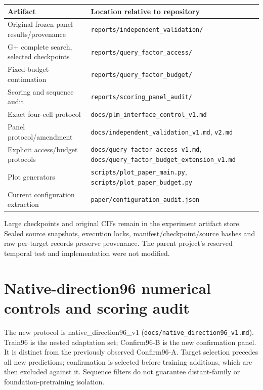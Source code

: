 \begin{longtable}[]{@{}
  >{\raggedright\arraybackslash}p{}
  >{\raggedright\arraybackslash}p{}@{}}
\toprule\noalign{}
\begin{minipage}[b]{\linewidth}\raggedright
Artifact
\end{minipage} & \begin{minipage}[b]{\linewidth}\raggedright
Location relative to repository
\end{minipage} \\
\midrule\noalign{}
\endhead
\bottomrule\noalign{}
\endlastfoot
Original frozen panel results/provenance & \nolinkurl{reports/independent_validation/} \\
G+ complete search, selected checkpoints & \nolinkurl{reports/query_factor_access/} \\
Fixed-budget continuation & \nolinkurl{reports/query_factor_budget/} \\
Scoring and sequence audit & \nolinkurl{reports/scoring_panel_audit/} \\
Exact four-cell protocol & \nolinkurl{docs/plm_interface_control_v1.md} \\
Panel protocol/amendment & \nolinkurl{docs/independent_validation_v1.md}, \nolinkurl{v2.md} \\
Explicit access/budget protocols & \nolinkurl{docs/query_factor_access_v1.md}, \nolinkurl{docs/query_factor_budget_extension_v1.md} \\
Plot generators & \nolinkurl{scripts/plot_paper_main.py}, \nolinkurl{scripts/plot_paper_budget.py} \\
Current configuration extraction & \nolinkurl{paper/configuration_audit.json} \\
\end{longtable}

Large checkpoints and original CIFs remain in the experiment artifact store. Sealed source snapshots, execution locks,
manifest/checkpoint/source hashes and raw per-target records preserve provenance.
The parent project's reserved temporal test and implementation were not modified.

\section{Native-direction96 numerical controls and scoring audit}\label{native-direction96-numerical-controls-and-scoring-audit}

The new protocol is native\_direction96\_v1 (\nolinkurl{docs/native_direction96_v1.md}). Train96 is the nested adaptation set; Confirm96-B is the new confirmation panel. It is distinct from the previously observed Confirm96-A. Target selection precedes all new predictions; confirmation is selected before training additions, which are then excluded against it. Sequence filters do not guarantee distant-family or foundation-pretraining isolation.

